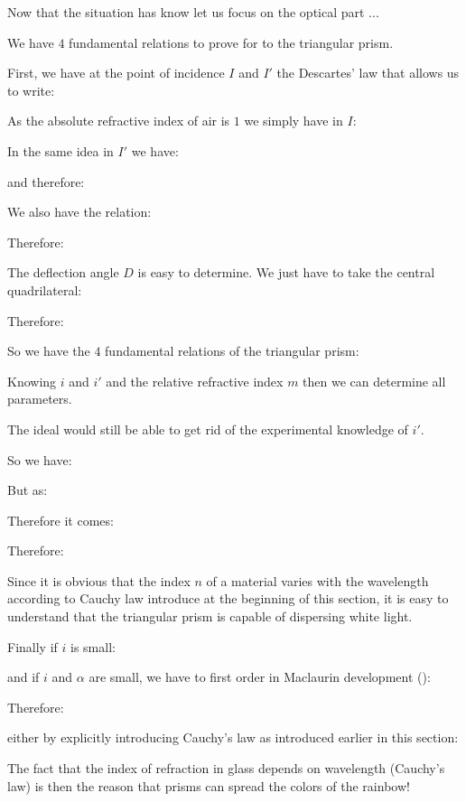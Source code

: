 	Now that the situation has know let us focus on the optical part ...

	We have $4$ fundamental relations to prove for to the triangular prism.

	First, we have at the point of incidence $I$ and $I'$ the Descartes' law that allows us to write:
	
	As the absolute refractive index of air is $1$ we simply have in $I$:
	
	In the same idea in $I'$ we have:
	
	and therefore:
	
	We also have the relation:
	
	Therefore:
	
	The deflection angle $D$ is easy to determine. We just have to take the central quadrilateral:
	
	Therefore:
	
	So we have the $4$ fundamental relations of the triangular prism:
	
	Knowing $i$ and $i'$ and the relative refractive index $m$ then we can determine all parameters.

	The ideal would still be able to get rid of the experimental knowledge of $i'$.

	So we have:
	
	But as:
	
	Therefore it comes:
	
	Therefore:
	
	Since it is obvious that the index $n$ of a material varies with the wavelength according to Cauchy law introduce at the beginning of this section, it is easy to understand that the triangular prism is capable of dispersing white light.

	Finally if $i$ is small:
	
	and if $i$ and $\alpha$ are small, we have to first order in Maclaurin development ():
	
	Therefore:
	
	either by explicitly introducing Cauchy's law as introduced earlier in this section:
	
	The fact that the index of refraction in glass depends on wavelength (Cauchy's law) is then the reason that prisms can spread the colors of the rainbow!
	
	\pagebreak
